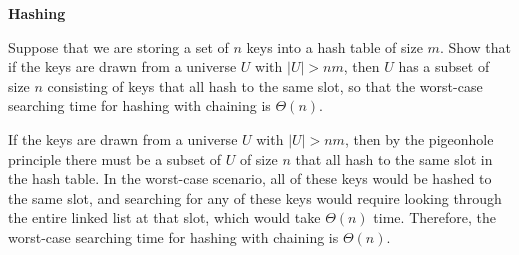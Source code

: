 \question \textbf{Hashing}

Suppose that we are storing a set of $n$ keys into a hash table of size $m$. Show that if the keys are drawn from a universe $U$ with $\lvert U \rvert > nm$, then $U$ has a subset of size $n$ consisting of keys that all hash to the same slot, so that the worst-case searching time for hashing with chaining is $\Theta(n)$.

\begin{solution}
If the keys are drawn from a universe $U$ with $\lvert U \rvert > nm$, then by the pigeonhole principle there must be a subset of $U$ of size $n$ that all hash to the same slot in the hash table. In the worst-case scenario, all of these keys would be hashed to the same slot, and searching for any of these keys would require looking through the entire linked list at that slot, which would take $\Theta(n)$ time. Therefore, the worst-case searching time for hashing with chaining is $\Theta(n)$.

\end{solution}
